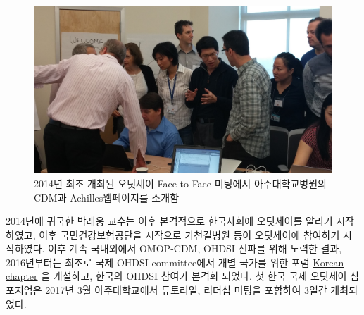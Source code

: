 \documentclass[11pt]{book}
\theoremstyle{definition}
\theoremstyle{definition}
\theoremstyle{definition}
\theoremstyle{remark}
\begin{document}
\begin{figure}

{\centering \includegraphics[width=0.8\linewidth]{images/OhdsiCommunity/2014f2fmeeting_korea} 

}

\caption{2014년 최초 개최된 오딧세이 Face to Face 미팅에서 아주대학교병원의 CDM과 Achilles웹페이지를 소개함}\label{fig:OHDSIf2f2014}
\end{figure}

2014년에 귀국한 박래웅 교수는 이후 본격적으로 한국사회에 오딧세이를
알리기 시작하였고, 이후 국민건강보험공단을 시작으로 가천길병원 등이
오딧세이에 참여하기 시작하였다. 이후 계속 국내외에서 OMOP-CDM, OHDSI
전파를 위해 노력한 결과, 2016년부터는 최초로 국제 OHDSI committee에서
개별 국가를 위한 포럼
\href{http://forums.ohdsi.org/c/For-collaborators-wishing-to-communicate-in-Korean}{Korean
chapter} 을 개설하고, 한국의 OHDSI 참여가 본격화 되었다. 첫 한국 국제
오딧세이 심포지엄은 2017년 3월 아주대학교에서 튜토리얼, 리더십 미팅을
포함하여 3일간 개최되었다.
\end{document}
